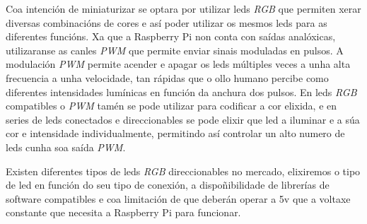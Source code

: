 Coa intención de miniaturizar se optara por utilizar leds \emph{RGB} que permiten xerar diversas combinacións de cores e así poder utilizar os mesmos leds para as diferentes funcións.
Xa que a Raspberry Pi non conta con saídas analóxicas, utilizaranse as canles \emph{PWM} que permite enviar sinais moduladas en pulsos. A modulación \emph{PWM} permite acender e apagar os leds múltiples veces a unha alta frecuencia a unha velocidade, tan rápidas que o ollo humano percibe como diferentes intensidades lumínicas en función da anchura dos pulsos. En leds \emph{RGB} compatibles o \emph{PWM} tamén se pode utilizar para codificar a cor elixida, e en series de leds conectados e direccionables se pode elixir que led a iluminar e a súa cor e intensidade individualmente, permitindo así controlar un alto numero de leds cunha soa saída \emph{PWM}.

Existen diferentes tipos de leds \emph{RGB} direccionables no mercado, elixiremos o tipo de led en función do seu tipo de conexión, a dispoñibilidade de librerías de software compatibles e coa limitación de que deberán operar a 5v que a voltaxe constante que necesita a Raspberry Pi para funcionar.\\

